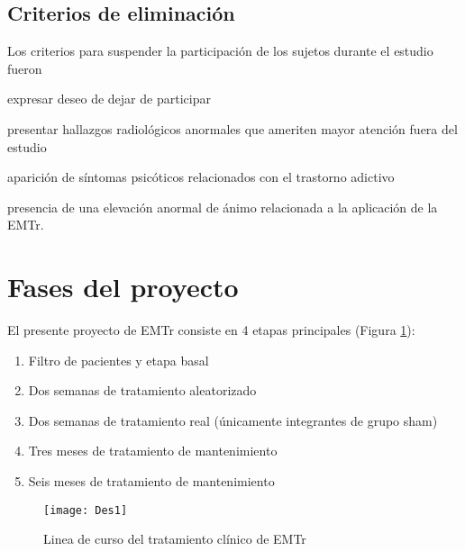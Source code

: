 \subsection{Criterios de eliminación}
Los criterios para suspender la participación de los sujetos durante el estudio fueron
\begin{enumerate*}[label=\emph{\alph*}), before=\unskip{: }, itemjoin={{; }}, itemjoin*={{, y }}]
    \item expresar deseo de dejar de participar
    \item presentar hallazgos radiológicos anormales que ameriten mayor atención fuera del estudio
    \item aparición de síntomas psicóticos relacionados con el trastorno adictivo
    \item presencia de una elevación anormal de ánimo relacionada a la aplicación de la EMTr.
\end{enumerate*}

\section{Fases del proyecto}
El presente proyecto de EMTr consiste en 4 etapas principales (Figura \ref{fig:txTMS}):
\begin{enumerate}[start=0,leftmargin=3\parindent,align=left,label=Etapa \arabic*:]
    \item Filtro de pacientes y etapa basal
    \item Dos semanas de tratamiento aleatorizado
    \item[Etapa 1-4:] Dos semanas de tratamiento real (únicamente integrantes de grupo sham)
    \item Tres meses de tratamiento de mantenimiento
    \item Seis meses de tratamiento de mantenimiento
\end{enumerate}

\begin{figure}[H]
    \centering
    \texttt{[image: Des1]}
    \caption{Linea de curso del tratamiento clínico de EMTr}
    \label{fig:txTMS}
\end{figure}


